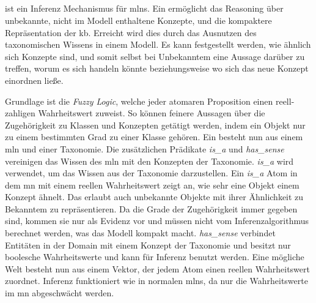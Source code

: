 \subsection{\fuzzymln}
\label{subsec:fuzzymln}
\fuzzymln ist ein Inferenz Mechanismus für \glspl{mln}. Ein \fuzzymln ermöglicht das Reasoning über unbekannte, nicht im Modell enthaltene Konzepte, und die kompaktere Repräsentation der \gls{kb}. Erreicht wird dies durch das Ausnutzen des taxonomischen Wissens in einem Modell. Es kann festgestellt werden, wie ähnlich sich Konzepte sind, und somit selbst bei Unbekanntem eine Aussage darüber zu treffen, worum es sich handeln könnte beziehungsweise wo sich das neue Konzept einordnen ließe. \par
Grundlage ist die \textit{Fuzzy Logic}, welche jeder atomaren Proposition einen reell-zahligen Wahrheitswert zuweist. So können feinere Aussagen über die Zugehörigkeit zu Klassen und Konzepten getätigt werden, indem ein Objekt nur zu einem bestimmten Grad zu einer Klasse gehören. Ein \fuzzymln besteht nun aus einem \gls{mln} und einer Taxonomie. Die zusätzlichen Prädikate \textit{is\_a} und \textit{has\_sense} vereinigen das Wissen des \gls{mln} mit den Konzepten der Taxonomie. \textit{is\_a} wird verwendet, um das Wissen aus der Taxonomie darzustellen. Ein \textit{is\_a} Atom in dem \gls{mn} mit einem reellen Wahrheitswert zeigt an, wie sehr eine Objekt einem Konzept ähnelt. Das erlaubt auch unbekannte Objekte mit ihrer Ähnlichkeit zu Bekanntem zu repräsentieren. Da die Grade der Zugehörigkeit immer gegeben sind, kommen sie nur als Evidenz vor und müssen nicht vom Inferenzalgorithmus berechnet werden, was das Modell kompakt macht. \textit{has\_sense} verbindet Entitäten in der Domain mit einem Konzept der Taxonomie und besitzt nur boolesche Wahrheitswerte und kann für Inferenz benutzt werden. \newline
Eine mögliche Welt besteht nun aus einem Vektor, der jedem Atom einen reellen Wahrheitswert zuordnet. Inferenz funktioniert wie in normalen \glspl{mln}, da nur die Wahrheitswerte im \gls{mn} abgeschwächt werden. \cite{nyga17}


